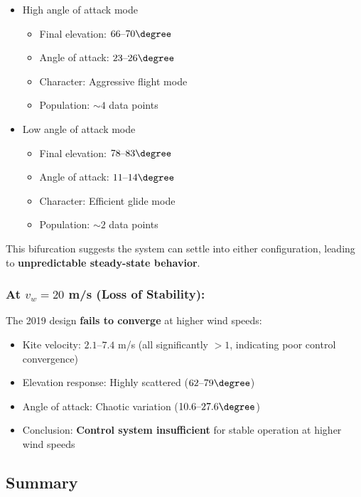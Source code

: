 \begin{itemize}
    \item[\textbf{Point 1:}] High angle of attack mode
    \begin{itemize}
        \item Final elevation: $66\text{--}70\degree$
        \item Angle of attack: $23\text{--}26\degree$
        \item Character: Aggressive flight mode
        \item Population: $\sim 4$ data points
    \end{itemize}
    
    \item[\textbf{Point 2:}] Low angle of attack mode
    \begin{itemize}
        \item Final elevation: $78\text{--}83\degree$
        \item Angle of attack: $11\text{--}14\degree$
        \item Character: Efficient glide mode
        \item Population: $\sim 2$ data points
    \end{itemize}
\end{itemize}

This bifurcation suggests the system can settle into either configuration, leading to \textbf{unpredictable steady-state behavior}.

\subsubsection*{At $v_w = 20$ m/s (Loss of Stability):}

The 2019 design \textbf{fails to converge} at higher wind speeds:
\begin{itemize}
    \item Kite velocity: $2.1\text{--}7.4$ m/s (all significantly $> 1$, indicating poor control convergence)
    \item Elevation response: Highly scattered ($62\text{--}79\degree$)
    \item Angle of attack: Chaotic variation ($10.6\text{--}27.6\degree$)
    \item Conclusion: \textbf{Control system insufficient} for stable operation at higher wind speeds
\end{itemize}

\subsection*{Summary}

